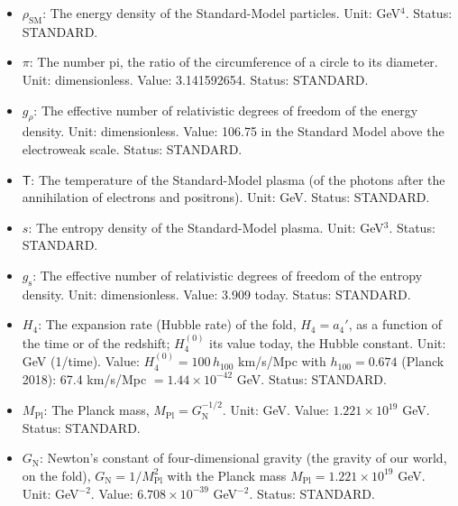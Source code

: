 \documentclass[
  10pt,
]{article}
\providecommand{\tightlist}{%
  \setlength{\itemsep}{0pt}\setlength{\parskip}{0pt}}
\begin{document}
\begin{itemize}
\tightlist
\item
  \(\rho_{\mathrm{SM}}\): The energy density of the Standard-Model
  particles. Unit: GeV\(^4\). Status: STANDARD.
\item
  \(\pi\): The number pi, the ratio of the circumference of a circle to
  its diameter. Unit: dimensionless. Value: 3.141592654. Status:
  STANDARD.
\item
  \(g_\rho\): The effective number of relativistic degrees of freedom of
  the energy density. Unit: dimensionless. Value: 106.75 in the Standard
  Model above the electroweak scale. Status: STANDARD.
\item
  \(\mathsf{T}\): The temperature of the Standard-Model plasma (of the
  photons after the annihilation of electrons and positrons). Unit: GeV.
  Status: STANDARD.
\item
  \(s\): The entropy density of the Standard-Model plasma. Unit:
  GeV\(^3\). Status: STANDARD.
\item
  \(g_{\mathrm{s}}\): The effective number of relativistic degrees of
  freedom of the entropy density. Unit: dimensionless. Value: 3.909
  today. Status: STANDARD.
\item
  \(H_4\): The expansion rate (Hubble rate) of the fold, \(H_4 = a_4'\),
  as a function of the time or of the redshift; \(H_4^{(0)}\) its value
  today, the Hubble constant. Unit: GeV (1/time). Value:
  \(H_4^{(0)} = 100\,h_{100}\) km/s/Mpc with \(h_{100} = 0.674\) (Planck
  2018): 67.4 km/s/Mpc \(= 1.44\times10^{-42}\) GeV. Status: STANDARD.
\item
  \(M_{\mathrm{Pl}}\): The Planck mass,
  \(M_{\mathrm{Pl}} = G_{\mathrm{N}}^{-1/2}\). Unit: GeV. Value:
  \(1.221\times10^{19}\) GeV. Status: STANDARD.
\item
  \(G_{\mathrm{N}}\): Newton's constant of four-dimensional gravity (the
  gravity of our world, on the fold),
  \(G_{\mathrm{N}} = 1/M_{\mathrm{Pl}}^2\) with the Planck mass
  \(M_{\mathrm{Pl}} = 1.221\times10^{19}\) GeV. Unit: GeV\(^{-2}\).
  Value: \(6.708\times10^{-39}\) GeV\(^{-2}\). Status: STANDARD.
\end{itemize}
\end{document}
